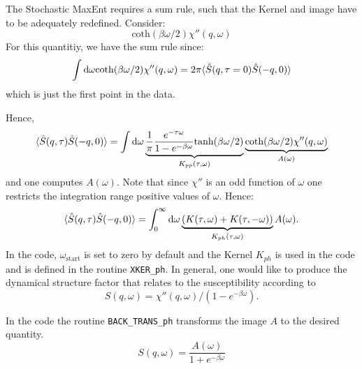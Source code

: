 The  Stochastic MaxEnt requires a sum rule, such that   the Kernel and image have to be adequately redefined. 
Consider: 
\begin{equation}
	\text{coth}(\beta \omega/2) \chi''(q,\omega)
\end{equation}
For this quantitiy, we have the sum rule since: 
\begin{equation}
	\int {\text d} \omega 	\text{coth}(\beta \omega/2) \chi''(q,\omega) = 
  2 \pi \langle \hat{S}(q,\tau=0) \hat{S}(-q,0) \rangle
\end{equation}
which is just the first point in the data. 

Hence,
\begin{equation}
	\langle \hat{S}(q,\tau) \hat{S}(-q,0) \rangle  =  
       \int {\text d} \omega  \underbrace{ \frac{1}{\pi} \frac{e^{- \tau \omega} }
            { 1 - e^{-\beta  \omega} } \text{tanh}(\beta \omega/2)  }_{K_{pp}(\tau,\omega)} 
       \underbrace{ \text{coth}(\beta \omega/2)   \chi''(q,\omega) }_{A(\omega)} 
\label{Kpp.eq}
\end{equation}
and one  computes $A(\omega)$. Note that since $\chi'' $ is an odd function of $\omega$  one restricts the integration range  positive values of $\omega$. 
Hence: 
\begin{equation}
	\langle \hat{S}(q,\tau) \hat{S}(-q,0) \rangle  =  
       \int_{0}^{\infty}  {\text d} \omega \underbrace{\left( K(\tau,\omega)  + K(\tau,-\omega) \right)}_{K_{ph}(\tau,\omega)}  A(\omega).
\end{equation}
In the code, $\omega_\text{start}$ is set to zero by default and the Kernel $K_{ph}$ is used in the code and is defined in the  routine \texttt{XKER\_ph}. 
In general,  one would like to produce the  dynamical structure factor that relates to the susceptibility according to
\begin{equation}
 S(q,\omega)  = \chi''(q,\omega)/\left( 1 - e^{-\beta  \omega} \right). 
\end{equation}

In the code the routine \texttt{BACK\_TRANS\_ph}   transforms the image $A$ to the desired quantity.
\begin{equation}
	S(q,\omega) = \frac{A(\omega)}{1 + e^{-\beta \omega} }  
\end{equation}

